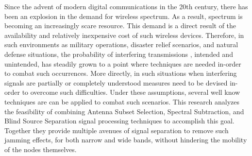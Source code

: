 Since the advent of modern digital communications in the 20th century, there has been an explosion in the demand for wireless spectrum. As a result, spectrum is becoming an increasingly scare resource. This demand is a direct result of the availability and relatively inexpensive cost of such wireless devices. Therefore, in such environments as military operations, disaster relief scenarios, and natural defense situations, the probability of interfering transmissions \cite{scarcity}, intended and unintended, has steadily grown to a point where techniques are needed in-order to combat such occurrences. More directly, in such situations when interfering signals are partially or completely understood measures need to be devised in-order to overcome such difficulties. Under these assumptions, several well know techniques are can be applied to combat such scenarios.  This research analyzes the feasibility of combining Antenna Subset Selection, Spectral Subtraction, and Blind Source Separation signal processing techniques to accomplish this goal.  Together they provide multiple avenues of signal separation to remove such jamming effects, for both narrow and wide bands, without hindering the mobility of the nodes themselves.
